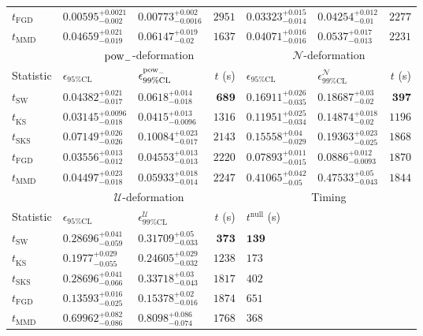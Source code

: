 \begin{tabular}{l|llr|llr}
	$t_{\mathrm{FGD}}$ & ${\mathbf{0.00595_{-0.002}^{+0.0021}}}$ & ${\mathbf{0.00773_{-0.0016}^{+0.002}}}$ & $2951$ & $0.03323_{-0.014}^{+0.015}$ & ${\mathbf{0.04254_{-0.01}^{+0.012}}}$ & $2277$ \\
	$t_{\mathrm{MMD}}$ & $0.04659_{-0.019}^{+0.021}$ & $0.06147_{-0.02}^{+0.019}$ & $1637$ & $0.04071_{-0.016}^{+0.016}$ & $0.0537_{-0.013}^{+0.017}$ & $2231$ \\
	\toprule
	\multicolumn{1}{c}{} & \multicolumn{3}{c}{$\rm{pow}_{-}$-deformation} & \multicolumn{3}{c}{$\mathcal{N}$-deformation} \\
	Statistic & $\epsilon_{95\%\mathrm{CL}}$ & $\epsilon^  {\rm{pow}_{-}}_{99\%\mathrm{CL}}$ & $t$ (s) & $\epsilon_{95\%\mathrm{CL}}$ & $\epsilon^    {\mathcal{N}}_{99\%\mathrm{CL}}$ & $t$ (s) \\
	\midrule
	$t_{\mathrm{SW}}$ & $0.04382_{-0.017}^{+0.021}$ & $0.0618_{-0.018}^{+0.014}$ & ${\mathbf{689}}$ & $0.16911_{-0.035}^{+0.026}$ & $0.18687_{-0.02}^{+0.03}$ & ${\mathbf{397}}$ \\
	$t_{\overline{\mathrm{KS}}}$ & ${\mathbf{0.03145_{-0.018}^{+0.0096}}}$ & ${\mathbf{0.0415_{-0.0096}^{+0.013}}}$ & $1316$ & $0.11951_{-0.034}^{+0.025}$ & $0.14874_{-0.02}^{+0.018}$ & $1196$ \\
	$t_{\mathrm{SKS}}$ & $0.07149_{-0.026}^{+0.026}$ & $0.10084_{-0.017}^{+0.023}$ & $2143$ & $0.15558_{-0.029}^{+0.04}$ & $0.19363_{-0.025}^{+0.023}$ & $1868$ \\
	$t_{\mathrm{FGD}}$ & $0.03556_{-0.012}^{+0.013}$ & $0.04553_{-0.013}^{+0.013}$ & $2220$ & ${\mathbf{0.07893_{-0.015}^{+0.011}}}$ & ${\mathbf{0.0886_{-0.0093}^{+0.012}}}$ & $1870$ \\
	$t_{\mathrm{MMD}}$ & $0.04497_{-0.018}^{+0.023}$ & $0.05933_{-0.014}^{+0.018}$ & $2247$ & $0.41065_{-0.05}^{+0.042}$ & $0.47533_{-0.043}^{+0.05}$ & $1844$ \\
	\toprule
	\multicolumn{1}{c}{} & \multicolumn{3}{c}{$\mathcal{U}$-deformation} & \multicolumn{3}{c}{Timing} \\
	Statistic & $\epsilon_{95\%\mathrm{CL}}$ & $\epsilon^    {\mathcal{U}}_{99\%\mathrm{CL}}$ & $t$ (s) & $t^{\mathrm{null}}$ (s) \\
	\midrule
	$t_{\mathrm{SW}}$ & $0.28696_{-0.059}^{+0.041}$ & $0.31709_{-0.033}^{+0.05}$ & ${\mathbf{373}}$ & ${\mathbf{139}}$ \\
	$t_{\overline{\mathrm{KS}}}$ & $0.1977_{-0.055}^{+0.029}$ & $0.24605_{-0.032}^{+0.029}$ & $1238$ & $173$ \\
	$t_{\mathrm{SKS}}$ & $0.28696_{-0.066}^{+0.041}$ & $0.33718_{-0.043}^{+0.03}$ & $1817$ & $402$ \\
	$t_{\mathrm{FGD}}$ & ${\mathbf{0.13593_{-0.025}^{+0.016}}}$ & ${\mathbf{0.15378_{-0.016}^{+0.02}}}$ & $1874$ & $651$ \\
	$t_{\mathrm{MMD}}$ & $0.69962_{-0.086}^{+0.082}$ & $0.8098_{-0.074}^{+0.086}$ & $1768$ & $368$ \\
	\bottomrule
\end{tabular}
